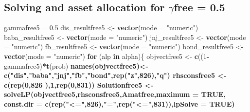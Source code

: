 \documentclass[]{article}
\newenvironment{Shaded}{\begin{snugshade}}{\end{snugshade}}
\newcommand{\KeywordTok}[1]{\textcolor[rgb]{0.13,0.29,0.53}{\textbf{#1}}}
\newcommand{\DataTypeTok}[1]{\textcolor[rgb]{0.13,0.29,0.53}{#1}}
\newcommand{\DecValTok}[1]{\textcolor[rgb]{0.00,0.00,0.81}{#1}}
\newcommand{\FloatTok}[1]{\textcolor[rgb]{0.00,0.00,0.81}{#1}}
\newcommand{\StringTok}[1]{\textcolor[rgb]{0.31,0.60,0.02}{#1}}
\newcommand{\OtherTok}[1]{\textcolor[rgb]{0.56,0.35,0.01}{#1}}
\newcommand{\ControlFlowTok}[1]{\textcolor[rgb]{0.13,0.29,0.53}{\textbf{#1}}}
\newcommand{\OperatorTok}[1]{\textcolor[rgb]{0.81,0.36,0.00}{\textbf{#1}}}
\newcommand{\NormalTok}[1]{#1}
\begin{document}
\subsection{\texorpdfstring{Solving and asset allocation for
\(\gamma\)free =
0.5}{Solving and asset allocation for \textbackslash{}gammafree = 0.5}}\label{solving-and-asset-allocation-for-gammafree-0.5}

\begin{Shaded}
\begin{Highlighting}[]
\NormalTok{gammafree5 =}\StringTok{ }\FloatTok{0.5}
\NormalTok{dis_resultfree5 <-}\StringTok{ }\KeywordTok{vector}\NormalTok{(}\DataTypeTok{mode =} \StringTok{"numeric"}\NormalTok{)}
\NormalTok{baba_resultfree5 <-}\StringTok{ }\KeywordTok{vector}\NormalTok{(}\DataTypeTok{mode =} \StringTok{"numeric"}\NormalTok{)}
\NormalTok{jnj_resultfree5 <-}\StringTok{ }\KeywordTok{vector}\NormalTok{(}\DataTypeTok{mode =} \StringTok{"numeric"}\NormalTok{)}
\NormalTok{fb_resultfree5 <-}\StringTok{ }\KeywordTok{vector}\NormalTok{(}\DataTypeTok{mode =} \StringTok{"numeric"}\NormalTok{)}
\NormalTok{bond_resultfree5 <-}\StringTok{ }\KeywordTok{vector}\NormalTok{(}\DataTypeTok{mode =} \StringTok{"numeric"}\NormalTok{)}
\ControlFlowTok{for}\NormalTok{ (alp }\ControlFlowTok{in}\NormalTok{ alpha)\{}
\NormalTok{  objvectfree5 <-}\StringTok{ }\KeywordTok{c}\NormalTok{((}\DecValTok{1}\OperatorTok{-}\NormalTok{gammafree5)}\OperatorTok{*}\KeywordTok{t}\NormalTok{(prob)}\OperatorTok{%
  \KeywordTok{names}\NormalTok{(objvectfree5)<-}\KeywordTok{c}\NormalTok{(}\StringTok{"dis"}\NormalTok{,}\StringTok{"baba"}\NormalTok{,}\StringTok{"jnj"}\NormalTok{,}\StringTok{"fb"}\NormalTok{,}\StringTok{"bond"}\NormalTok{,}\KeywordTok{rep}\NormalTok{(}\StringTok{"z"}\NormalTok{,}\DecValTok{826}\NormalTok{),}\StringTok{"q"}\NormalTok{) }
\NormalTok{  rhsconsfree5 <-}\StringTok{ }\KeywordTok{c}\NormalTok{(}\KeywordTok{rep}\NormalTok{(}\DecValTok{0}\NormalTok{,}\DecValTok{826}\NormalTok{ ),}\DecValTok{1}\NormalTok{,}\KeywordTok{rep}\NormalTok{(}\DecValTok{0}\NormalTok{,}\DecValTok{831}\NormalTok{))}
\NormalTok{  Solutionfree5 <-}\StringTok{ }\KeywordTok{solveLP}\NormalTok{(objvectfree5,rhsconsfree5,Amatfree,}\DataTypeTok{maximum =} \OtherTok{TRUE}\NormalTok{,}
          \DataTypeTok{const.dir =} \KeywordTok{c}\NormalTok{(}\KeywordTok{rep}\NormalTok{(}\StringTok{"<="}\NormalTok{,}\DecValTok{826}\NormalTok{),}\StringTok{"="}\NormalTok{,}\KeywordTok{rep}\NormalTok{(}\StringTok{"<="}\NormalTok{,}\DecValTok{831}\NormalTok{)),}\DataTypeTok{lpSolve =} \OtherTok{TRUE}\NormalTok{)}
}
\end{Highlighting}
\end{Shaded}
\end{document}
